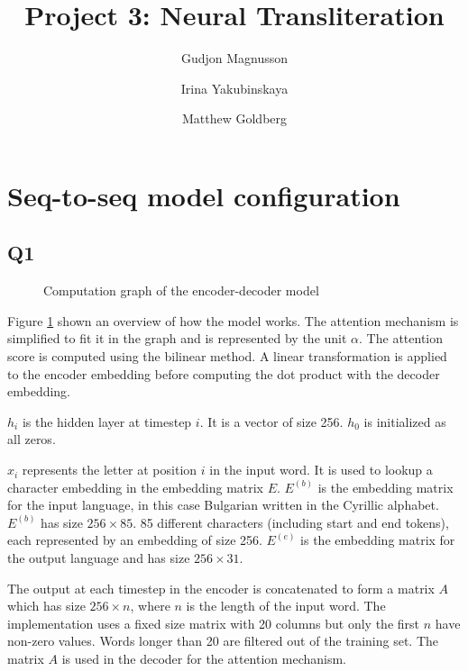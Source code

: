 \documentclass[12pt]{article}
\begin{document}
\title{
	Project 3: Neural Transliteration
}
\author{
Gudjon Magnusson 
\and Irina Yakubinskaya 
\and Matthew Goldberg
}

\maketitle


\section{Seq-to-seq model configuration}

\subsection{Q1}

\begin{figure}[!h]
\centering



\caption{Computation graph of the encoder-decoder model}
\label{fig_compgraph}
\end{figure}

Figure \ref{fig_compgraph} shown an overview of how the model works. The attention mechanism is simplified to fit it in the graph and is represented by the unit $\alpha$. The attention score is computed using the bilinear method. A linear transformation is applied to the encoder embedding before computing the dot product with the decoder embedding.

$h_i$ is the hidden layer at timestep $i$. It is a vector of size 256. $h_0$ is initialized as all zeros.

$x_i$ represents the letter at position $i$ in the input word. It is used to lookup a character embedding in the embedding matrix $E$. $E^{(b)}$ is the embedding matrix for the input language, in this case Bulgarian written in the Cyrillic alphabet. $E^{(b)}$ has size $256 \times 85$. 85 different characters (including start and end tokens), each represented by an embedding of size 256. $E^{(e)}$ is the embedding matrix for the output language and has size $256 \times 31$.

The output at each timestep in the encoder is concatenated to form a matrix $A$ which has size $256 \times n$, where $n$ is the length of the input word. The implementation uses a fixed size matrix with 20 columns but only the first $n$ have non-zero values. Words longer than 20 are filtered out of the training set.
The matrix $A$ is used in the decoder for the attention mechanism.
\end{document}
